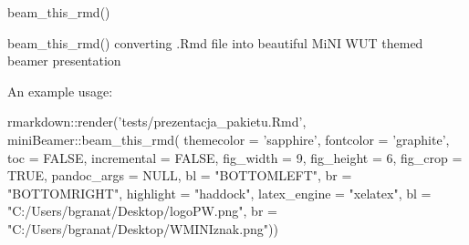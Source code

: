 \documentclass[
  ignorenonframetext,
]{beamer}
\newenvironment{Shaded}{}{}
\newcommand{\DataTypeTok}[1]{#1}
\newcommand{\DecValTok}[1]{#1}
\newcommand{\KeywordTok}[1]{\textcolor[rgb]{0.00,0.00,1.00}{#1}}
\newcommand{\NormalTok}[1]{#1}
\newcommand{\OperatorTok}[1]{#1}
\newcommand{\OtherTok}[1]{\textcolor[rgb]{1.00,0.25,0.00}{#1}}
\newcommand{\StringTok}[1]{\textcolor[rgb]{0.00,0.50,0.50}{#1}}
\begin{document}
\begin{frame}[fragile]{beam\_this\_rmd()}
\protect\hypertarget{beam_this_rmd-1}{}

beam\_this\_rmd() converting .Rmd file into beautiful MiNI WUT themed
beamer presentation

An example usage:

\scriptsize

\begin{Shaded}
\begin{Highlighting}[]
\NormalTok{rmarkdown}\OperatorTok{::}\KeywordTok{render}\NormalTok{(}\StringTok{'tests/prezentacja_pakietu.Rmd'}\NormalTok{, }
\NormalTok{    miniBeamer}\OperatorTok{::}\KeywordTok{beam_this_rmd}\NormalTok{(}
      \DataTypeTok{themecolor =} \StringTok{'sapphire'}\NormalTok{,}
      \DataTypeTok{fontcolor =} \StringTok{'graphite'}\NormalTok{,}
      \DataTypeTok{toc =} \OtherTok{FALSE}\NormalTok{,}
      \DataTypeTok{incremental =} \OtherTok{FALSE}\NormalTok{,}
      \DataTypeTok{fig_width =} \DecValTok{9}\NormalTok{,}
      \DataTypeTok{fig_height =} \DecValTok{6}\NormalTok{,}
      \DataTypeTok{fig_crop =} \OtherTok{TRUE}\NormalTok{,}
      \DataTypeTok{pandoc_args =} \OtherTok{NULL}\NormalTok{,}
      \DataTypeTok{bl =} \StringTok{"BOTTOMLEFT"}\NormalTok{,}
      \DataTypeTok{br =} \StringTok{"BOTTOMRIGHT"}\NormalTok{,}
      \DataTypeTok{highlight =} \StringTok{"haddock"}\NormalTok{,}
      \DataTypeTok{latex_engine =} \StringTok{"xelatex"}\NormalTok{,}
      \DataTypeTok{bl =} \StringTok{"C:/Users/bgranat/Desktop/logoPW.png"}\NormalTok{,}
      \DataTypeTok{br =} \StringTok{"C:/Users/bgranat/Desktop/WMINIznak.png"}\NormalTok{))}
\end{Highlighting}
\end{Shaded}

\end{frame}
\end{document}
